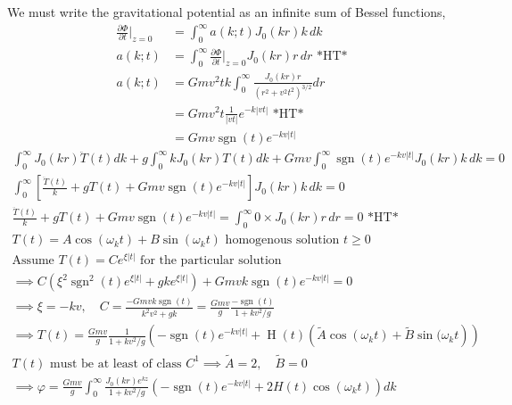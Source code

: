 \documentclass[10pt]{article}
\DeclareMathOperator{\sgn}{sgn}
\DeclareMathOperator{\Heavi}{H}
\begin{document}
We must write the gravitational potential as an infinite sum of Bessel functions,
\begin{align*}
\frac{\partial \Phi}{\partial t}\bigg|_{z=0} &= \int_0^\infty a(k; t)J_0(k r)k \, dk \\
a(k; t) &= \int_0^\infty \frac{\partial \Phi}{\partial t}\bigg|_{z=0} J_0(k r) r \, dr \text{ *HT*} \\
a(k;t) &= Gmv^2tk \int_0^\infty \frac{ J_0(k r) r}{(r^2+v^2t^2)^{3/2}} dr \\
&= Gmv^2t \frac{1}{|vt|} e^{-k|vt|} \text{ *HT*} \\
&= Gmv \sgn(t)e^{-kv|t|}
\end{align*}
\begin{gather*}
\int_0^\infty J_0(kr)  \ddot{T}(t) dk + g \int_0^\infty k J_0(kr) T(t) dk + Gmv \int_0^\infty \sgn(t) e^{-kv|t|} J_0(kr)k \, dk = 0 \\
\int_0^\infty \left[ \frac{\ddot{T}(t)}{k} + gT(t) + Gmv \sgn(t) e^{-kv|t|} \right] J_0(kr) k \, dk = 0 \\
\frac{\ddot{T}(t)}{k} + gT(t) + Gmv \sgn(t) e^{-kv|t|} = \int_0^\infty 0 \times J_0(kr) r \, dr = 0 \text{ *HT*} \\
T(t) = A \cos(\omega_k t) + B \sin(\omega_k t) \text{ homogenous solution } t \geq 0 \\
\text{Assume } T(t) = C e^{\xi |t|} \text{ for the particular solution} \\
\implies C \left(\xi^2 \sgn^2(t) e^{\xi |t|} + gk e^{\xi |t|} \right) + Gmvk \sgn(t) e^{-kv|t|} = 0 \\
\implies \xi = -kv, \quad C = \frac{-Gmvk \sgn(t)}{k^2v^2 + gk} = \frac{Gmv}{g} \frac{-\sgn(t)}{1+kv^2/g} \\
\implies T(t) = \frac{Gmv}{g} \frac{1}{1+kv^2/g} \left( -\sgn(t) e^{-kv|t|} + \Heavi(t) \left( \widetilde{A} \cos(\omega_k t) + \widetilde{B} \sin(\omega_k t \right) \right) \\
T(t) \text{ must be at least of class } C^1 \implies \widetilde{A} = 2, \quad \widetilde{B} = 0 \\
\implies \varphi = \frac{Gmv}{g} \int_0^\infty \frac{J_0(kr)e^{kz}}{1+kv^2/g} \left(-\sgn(t)e^{-kv|t|} + 2H(t)\cos(\omega_k t) \right)dk
\end{gather*}
\end{document}
